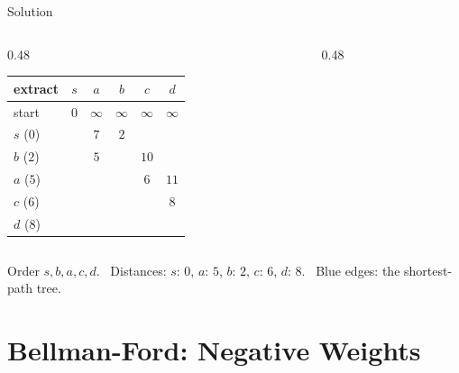 \documentclass[10pt,aspectratio=169]{beamer}
\begin{document}
\begin{frame}{Solution}
  \begin{columns}[c]
    \begin{column}{0.48\textwidth}
      \small
      \begin{tabular}{lccccc}
        \toprule
        extract & $s$ & $a$ & $b$ & $c$ & $d$ \\
        \midrule
        start          & $0$ & $\infty$ & $\infty$ & $\infty$ & $\infty$ \\
        $s$ ($0$)      & & $7$ & $2$ & & \\
        $b$ ($2$)      & & $5$ & & $10$ & \\
        $a$ ($5$)      & & & & $6$ & $11$ \\
        $c$ ($6$)      & & & & & $8$ \\
        $d$ ($8$)      & & & & & \\
        \bottomrule
      \end{tabular}
    \end{column}
    \begin{column}{0.48\textwidth}
      \begin{center}
      \end{center}
    \end{column}
  \end{columns}

  \bigskip
  \begin{center}
    Order $s, b, a, c, d$. \ Distances: $s{:}\,0$, $a{:}\,5$, $b{:}\,2$,
    $c{:}\,6$, $d{:}\,8$. \ Blue edges: the shortest-path tree.
  \end{center}
\end{frame}

\section{Bellman-Ford: Negative Weights}
\end{document}
